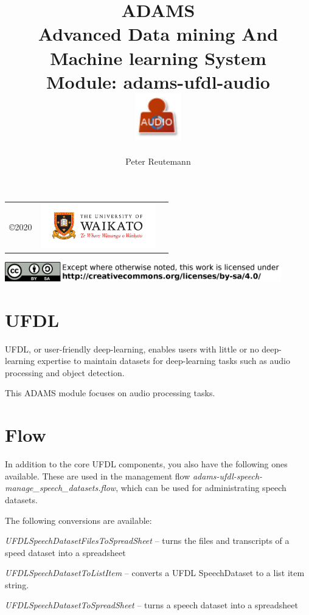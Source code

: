 \documentclass[a4paper]{book}
\title{
  \textbf{ADAMS} \\
  {\Large \textbf{A}dvanced \textbf{D}ata mining \textbf{A}nd \textbf{M}achine
  learning \textbf{S}ystem} \\
  {\Large Module: adams-ufdl-audio} \\
  \vspace{1cm}
  \includegraphics[width=2cm]{images/ufdl-audio-module.png} \\
}
\author{
  Peter Reutemann
}
\begin{document}
\begin{titlepage}
\maketitle

\thispagestyle{empty}
\center
\begin{table}[b]
	\begin{tabular}{c l l}
		\parbox[c][2cm]{2cm}{\copyright 2020} &
		\parbox[c][2cm]{5cm}{\includegraphics[width=5cm]{images/coat_of_arms.pdf}} \\
	\end{tabular}
	\includegraphics[width=12cm]{images/cc.png} \\
\end{table}

\end{titlepage}

\tableofcontents

\chapter{UFDL}
UFDL, or user-friendly deep-learning, enables users with little or no deep-learning
expertise to maintain datasets for deep-learning tasks such as audio processing
and object detection.

This ADAMS module focuses on audio processing tasks.

\chapter{Flow}

In addition to the core UFDL components, you also have the following ones available.
These are used in the management flow \textit{adams-ufdl-speech-manage\_speech\_datasets.flow},
which can be used for administrating speech datasets.

The following conversions are available:
\begin{tight_itemize}
  \item \textit{UFDLSpeechDatasetFilesToSpreadSheet} -- turns the files and transcripts of a speed dataset into a spreadsheet
  \item \textit{UFDLSpeechDatasetToListItem} -- converts a UFDL SpeechDataset to a list item string.
  \item \textit{UFDLSpeechDatasetToSpreadSheet} -- turns a speech dataset into a spreadsheet
\end{tight_itemize}
\end{document}
